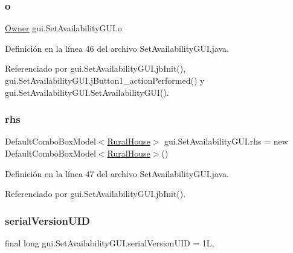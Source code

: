 \subsubsection{\texorpdfstring{o}{o}}
{\footnotesize\ttfamily \mbox{\hyperlink{classdomain_1_1_owner}{Owner}} gui.\+Set\+Availability\+G\+U\+I.\+o\hspace{0.3cm}{\ttfamily [private]}}



Definición en la línea 46 del archivo Set\+Availability\+G\+U\+I.\+java.



Referenciado por gui.\+Set\+Availability\+G\+U\+I.\+jb\+Init(), gui.\+Set\+Availability\+G\+U\+I.\+j\+Button1\+\_\+action\+Performed() y gui.\+Set\+Availability\+G\+U\+I.\+Set\+Availability\+G\+U\+I().

\mbox{\label{classgui_1_1_set_availability_g_u_i_a8ca9854f982f38653c058c2d5fae0110}} 
\subsubsection{\texorpdfstring{rhs}{rhs}}
{\footnotesize\ttfamily Default\+Combo\+Box\+Model$<$\mbox{\hyperlink{classdomain_1_1_rural_house}{Rural\+House}}$>$ gui.\+Set\+Availability\+G\+U\+I.\+rhs = new Default\+Combo\+Box\+Model$<$\mbox{\hyperlink{classdomain_1_1_rural_house}{Rural\+House}}$>$()\hspace{0.3cm}{\ttfamily [private]}}



Definición en la línea 47 del archivo Set\+Availability\+G\+U\+I.\+java.



Referenciado por gui.\+Set\+Availability\+G\+U\+I.\+jb\+Init().

\mbox{\label{classgui_1_1_set_availability_g_u_i_a2ac5c9f0315a16b755fd41ce36871808}} 
\subsubsection{\texorpdfstring{serialVersionUID}{serialVersionUID}}
{\footnotesize\ttfamily final long gui.\+Set\+Availability\+G\+U\+I.\+serial\+Version\+U\+ID = 1L\hspace{0.3cm}{\ttfamily [static]}, {\ttfamily [private]}}



